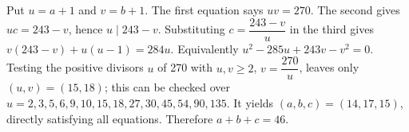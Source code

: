 Put $u=a+1$ and $v=b+1$. The first equation says $uv=270$. The second gives $uc=243-v$, hence $u\mid243-v$. Substituting $c=\dfrac{243-v}{u}$ in the third gives $v(243-v)+u(u-1)=284u$. Equivalently $u^2-285u+243v-v^2=0$. Testing the positive divisors $u$ of 270 with $u,v\ge2$, $v=\dfrac{270}{u}$, leaves only $(u,v)=(15,18)$; this can be checked over $u=2,3,5,6,9,10,15,18,27,30,45,54,90,135$. It yields $(a,b,c)=(14,17,15)$, directly satisfying all equations. Therefore $\boxed{a+b+c=46}$.
